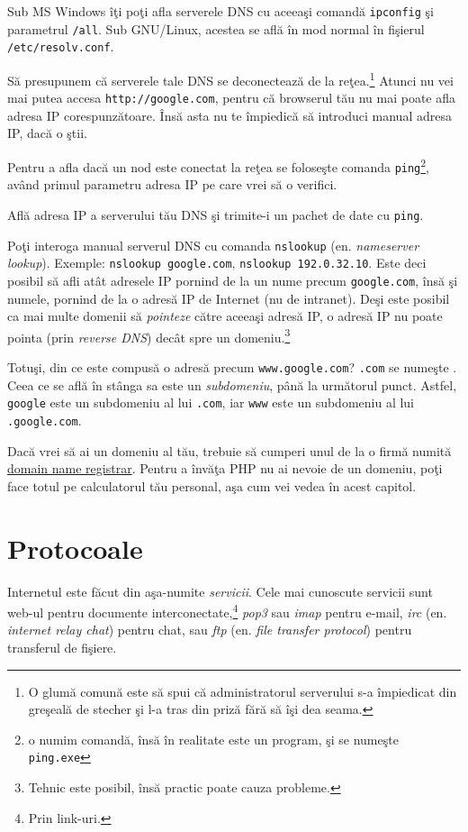 Sub MS Windows îţi poţi afla serverele DNS cu aceeaşi comandă \texttt{ipconfig} şi parametrul
\texttt{/all}. Sub GNU/Linux, acestea se află în mod normal în fişierul \texttt{/etc/resolv.conf}.

Să presupunem că serverele tale DNS se deconectează de la reţea.\footnote{O glumă
comună este să spui că administratorul serverului s-a împiedicat din greşeală de stecher
şi l-a tras din priză fără să îşi dea seama.} Atunci nu vei mai putea accesa \texttt{http://google.com},
pentru că browserul tău nu mai poate afla adresa IP corespunzătoare. Însă asta nu te împiedică
să introduci manual adresa IP, dacă o ştii.

Pentru a afla dacă un nod este conectat la reţea se foloseşte comanda
\texttt{ping}\footnote{o numim comandă, însă în realitate este un program,
şi se numeşte \texttt{ping.exe}}, având primul
parametru adresa IP pe care vrei să o verifici.

\begin{Exercise}[title={Ping your DNS server}]
Află adresa IP a serverului tău DNS şi trimite-i un pachet de date cu \texttt{ping}.
\end{Exercise}

Poţi interoga manual serverul DNS cu comanda \texttt{nslookup}
(en. \textsl{nameserver lookup}). Exemple:
\texttt{nslookup google.com}, \texttt{nslookup 192.0.32.10}.
Este deci posibil să afli atât adresele IP pornind de la un nume precum
\texttt{google.com}, însă şi numele, pornind de la o adresă IP de Internet
(nu de intranet).
Deşi este posibil ca mai multe domenii să \textsl{pointeze} către aceeaşi
adresă IP, o adresă IP nu poate {\glqq}pointa{\grqq} (prin \textsl{reverse DNS})
decât spre un domeniu.\footnote{Tehnic este posibil, însă practic poate
cauza probleme.}

Totuşi, din ce este compusă o adresă precum \texttt{www.google.com}?
\texttt{.com} se numeşte . Ceea ce se află în stânga
sa este un \textsl{subdomeniu}, până la următorul punct.
Astfel, \texttt{google} este un subdomeniu al lui \texttt{.com},
iar \texttt{www} este un subdomeniu al lui \texttt{.google.com}.

Dacă vrei să ai un domeniu al tău, trebuie să cumperi unul de la
o firmă numită \href{http://en.wikipedia.org/wiki/Domain_name_registrar}{domain name
registrar}. Pentru a învăţa PHP nu ai nevoie de un domeniu, poţi
face totul pe calculatorul tău personal, aşa cum vei vedea în acest capitol.

\section{Protocoale}
Internetul este {\glqq}făcut{\grqq} din aşa-numite \textsl{servicii}. Cele mai cunoscute servicii sunt
web-ul pentru documente interconectate,\footnote{Prin link-uri.}
\textsl{pop3} sau \textsl{imap} pentru e-mail,
\textsl{irc} (en. \textsl{internet relay chat}) pentru chat, sau
\textsl{ftp} (en. \textsl{file transfer protocol}) pentru transferul de fişiere.

